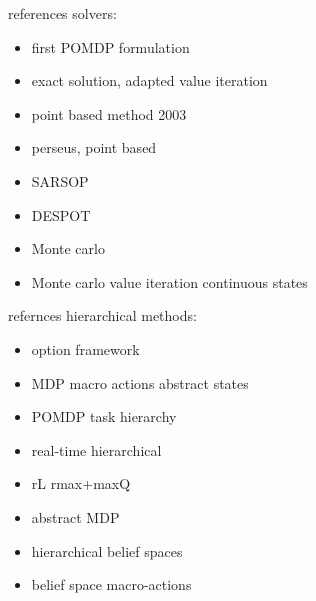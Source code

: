 references solvers:
\begin{itemize}
    \item\cite{10.2307/168926} first POMDP formulation
    \item \cite{KAELBLING199899} exact solution, adapted value iteration
    \item \cite{10.5555/1630659.1630806} point based method 2003
    \item \cite{Spaan_2005} perseus, point based
    \item \cite{6284837} SARSOP
    \item \cite{NIPS2013_5189} DESPOT
    \item \cite{NIPS2010_4031} Monte carlo
    \item\cite{Bai2011} Monte carlo value iteration continuous states
\end{itemize}
refernces hierarchical methods:
\begin{itemize}
    \item \cite{SUTTON1999181} option framework
    \item \cite{DBLP:journals/corr/abs-1301-7381} MDP macro actions abstract states
    \item \cite{Pineau02anintegrated} POMDP task hierarchy
    \item \cite{FOKA2007561} real-time hierarchical
    \item \cite{rmax} rL rmax+maxQ
    \item \cite{Gopalan2017PlanningWA} abstract MDP
    \item \cite{Lanighan2018PlanningRM} hierarchical belief spaces
    \item \cite{7140035} belief space macro-actions
\end{itemize}
 